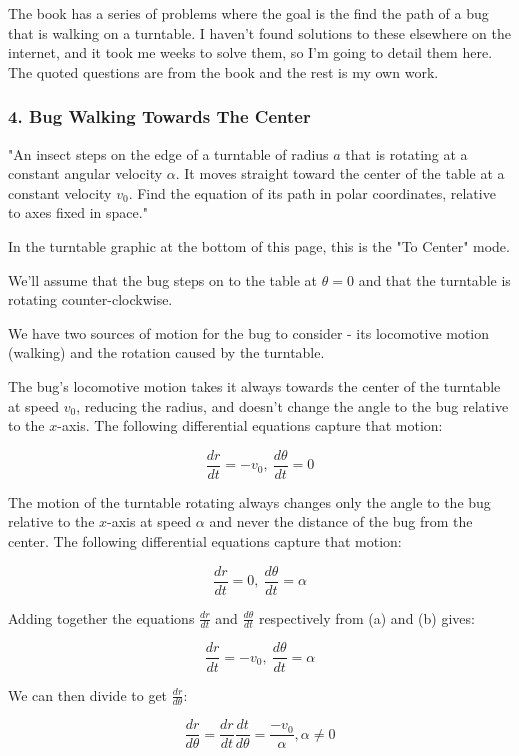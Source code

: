 \documentclass{article}
\begin{document}
The book has a series of problems where the goal is the find the path of a bug that is walking on a turntable. I haven't found solutions to these elsewhere on the internet, and it took me weeks to solve them, so I'm going to detail them here. The quoted questions are from the book and the rest is my own work.

\subsubsection{4. Bug Walking Towards The Center}

"An insect steps on the edge of a turntable of radius $a$ that is rotating at a constant angular velocity $\alpha$. It moves straight toward the center of the table at a constant velocity $v_0$. Find the equation of its path in polar coordinates, relative to axes fixed in space."

In the turntable graphic at the bottom of this page, this is the "To Center" mode.

We'll assume that the bug steps on to the table at $\theta = 0$ and that the turntable is rotating counter-clockwise.

We have two sources of motion for the bug to consider - its locomotive motion (walking) and the rotation caused by the turntable.

The bug's locomotive motion takes it always towards the center of the turntable at speed $v_0$, reducing the radius, and doesn't change the angle to the bug relative to the $x$-axis. The following differential equations capture that motion:

\[ \frac{dr}{dt} = -v_0,~\frac{d\theta}{dt} = 0 \tag{a} \]

The motion of the turntable rotating always changes only the angle to the bug relative to the $x$-axis at speed $\alpha$ and never the distance of the bug from the center. The following differential equations capture that motion:

\[ \frac{dr}{dt} = 0,~\frac{d\theta}{dt} = \alpha \tag{b} \]

Adding together the equations $\frac{dr}{dt}$ and $\frac{d\theta}{dt}$ respectively from (a) and (b) gives:

\[ \frac{dr}{dt} = -v_0,~\frac{d\theta}{dt} = \alpha \tag{c} \]

We can then divide to get $\frac{dr}{d\theta}$:

\[ \frac{dr}{d\theta} = \frac{dr}{dt}\frac{dt}{d\theta} = \frac{-v_0}{\alpha}, \alpha \neq 0 \tag{d} \]
\end{document}
